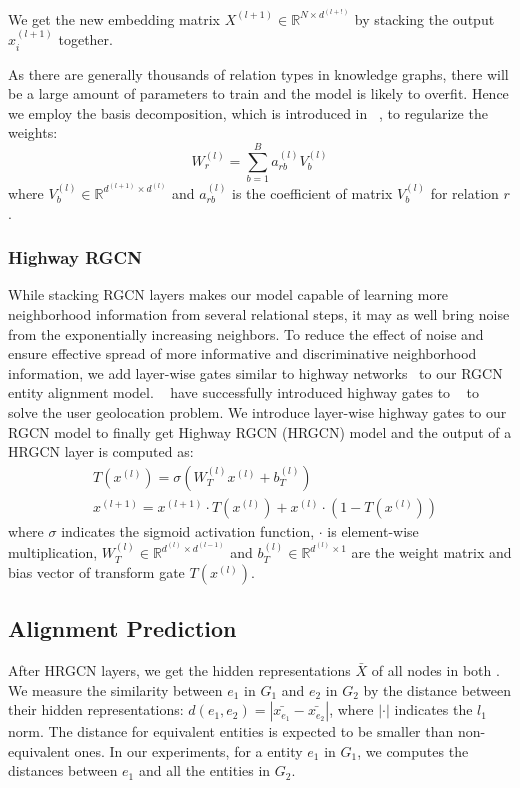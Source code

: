 	We get the new embedding matrix $X^{(l+1)} \in \mathbb{R}^{N \times d^{(l+!)}}$ by stacking the output $x_i^{(l+1)}$ together.
	
	As there are generally thousands of relation types in knowledge graphs, there will be a large amount of parameters to train and the model is likely to overfit. Hence we employ the basis decomposition, which is introduced in ~\cite{Schlichtkrull2017Modeling}, to regularize the weights:
	\begin{equation}
	W_r^{(l)}=\sum\limits_{b=1}^B a_{rb}^{(l)}V_b^{(l)}
	\end{equation}
	where $V_b^{(l)} \in \mathbb{R}^{d^{(l+1)} \times d^{(l)}}$ and $a_{rb}^{(l)}$ is the coefficient of matrix $V_b^{(l)}$ for relation $r$.
	
	
	\subsubsection{Highway RGCN}
	\label{section:hgcn}
	While stacking RGCN layers makes our model capable of learning more neighborhood information from several relational steps, it may as well bring noise from the exponentially increasing neighbors. To reduce the effect of noise and ensure effective spread of more informative and discriminative neighborhood information, we add layer-wise gates similar to highway networks~\cite{Srivastava2015Highway} to our RGCN entity alignment model. ~\cite{Rahimi2018Semi} have successfully introduced highway gates to \GCNs~\cite{Kipf2016Semi} to solve the user geolocation problem. We introduce layer-wise highway gates to our RGCN model to finally get Highway RGCN (HRGCN) model and the output of a HRGCN layer is computed as:
	\begin{equation}
	\begin{split}
	&T(x^{(l)})=\sigma(W_T^{(l)}x^{(l)}+b_T^{(l)}) \\
	&x^{(l+1)}=x^{(l+1)} \cdot T(x^{(l)})+x^{(l)} \cdot (1-T(x^{(l)}))
	\end{split}
	\end{equation}
	where $\sigma$ indicates the sigmoid activation function, $\cdot$ is element-wise multiplication, $W_T^{(l)} \in \mathbb{R}^{d^{(l)} \times d^{(l-1)}}$ and $b_T^{(l)} \in \mathbb{R}^{d^{(l)} \times 1}$ are the weight matrix and bias vector of transform gate $T(x^{(l)})$.
	
	\subsection{Alignment Prediction}
	After HRGCN layers, we get the hidden representations $\bar{X}$ of all nodes in both \KGs. We measure the similarity between $e_1$ in $G_1$ and $e_2$ in $G_2$ by the distance between their hidden representations: $d(e_1,e_2)=|\bar{x_{e_1}}-\bar{x_{e_2}}|$, where $|\cdot|$ indicates the $l_1$ norm. The distance for equivalent entities is expected to be smaller than non-equivalent ones. In our experiments, for a entity $e_1$ in $G_1$, we computes the distances between $e_1$ and all the entities in $G_2$.
	
